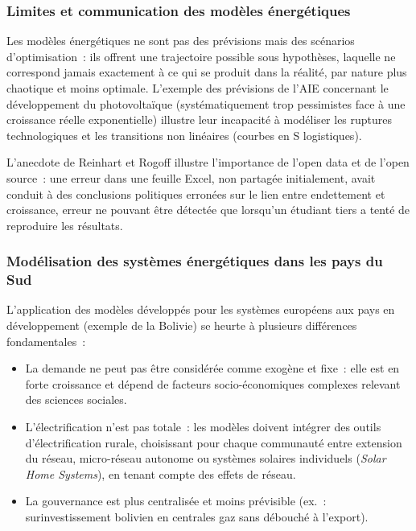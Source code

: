 \subsubsection{Limites et communication des modèles énergétiques}

Les modèles énergétiques ne sont pas des prévisions mais des scénarios d'optimisation~: ils offrent une trajectoire possible sous hypothèses, laquelle ne correspond jamais exactement à ce qui se produit dans la réalité, par nature plus chaotique et moins optimale. L'exemple des prévisions de l'AIE concernant le développement du photovoltaïque (systématiquement trop pessimistes face à une croissance réelle exponentielle) illustre leur incapacité à modéliser les ruptures technologiques et les transitions non linéaires (courbes en S logistiques).

L'anecdote de Reinhart et Rogoff illustre l'importance de l'open data et de l'open source~: une erreur dans une feuille Excel, non partagée initialement, avait conduit à des conclusions politiques erronées sur le lien entre endettement et croissance, erreur ne pouvant être détectée que lorsqu'un étudiant tiers a tenté de reproduire les résultats.

\subsubsection{Modélisation des systèmes énergétiques dans les pays du Sud}

L'application des modèles développés pour les systèmes européens aux pays en développement (exemple de la Bolivie) se heurte à plusieurs différences fondamentales~:

\begin{itemize}
    \item La demande ne peut pas être considérée comme exogène et fixe~: elle est en forte croissance et dépend de facteurs socio-économiques complexes relevant des sciences sociales.
    \item L'électrification n'est pas totale~: les modèles doivent intégrer des outils d'électrification rurale, choisissant pour chaque communauté entre extension du réseau, micro-réseau autonome ou systèmes solaires individuels (\textit{Solar Home Systems}), en tenant compte des effets de réseau.
    \item La gouvernance est plus centralisée et moins prévisible (ex.~: surinvestissement bolivien en centrales gaz sans débouché à l'export).
\end{itemize}

